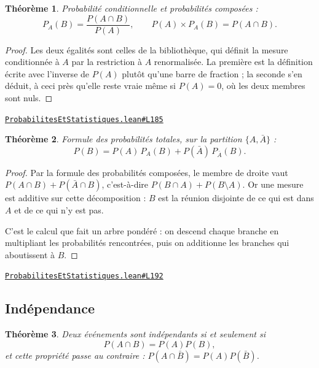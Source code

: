 \documentclass[11pt,a4paper]{article}
\theoremstyle{definition}
\theoremstyle{plain}
\newtheorem{theoreme}{Théorème}
\newcommand{\source}[2]{\par\smallskip\noindent\hfill{\footnotesize\href{#1}{\texttt{#2}}}\par\smallskip}
\begin{document}
\begin{theoreme}
Probabilité conditionnelle et probabilités composées :
\[ P_A(B) = \frac{P(A \cap B)}{P(A)} , \qquad P(A) \times P_A(B) = P(A \cap B) . \]
\end{theoreme}

\begin{proof}
Les deux égalités sont celles de la bibliothèque, qui définit la mesure conditionnée à $A$
par la restriction à $A$ renormalisée. La première est la définition écrite avec l'inverse
de $P(A)$ plutôt qu'une barre de fraction ; la seconde s'en déduit, à ceci près qu'elle
reste vraie même si $P(A) = 0$, où les deux membres sont nuls.
\end{proof}
\source{https://github.com/Commutator-IO/learn-lean/blob/main/cours/02-lycee/09-probabilites-et-statistiques/ProbabilitesEtStatistiques.lean\#L185}{ProbabilitesEtStatistiques.lean\#L185}

\begin{theoreme}
Formule des probabilités totales, sur la partition $\{A, \bar A\}$ :
\[ P(B) = P(A)\,P_A(B) + P(\bar A)\,P_{\bar A}(B) . \]
\end{theoreme}

\begin{proof}
Par la formule des probabilités composées, le membre de droite vaut
$P(A \cap B) + P(\bar A \cap B)$, c'est-à-dire $P(B \cap A) + P(B \setminus A)$. Or une
mesure est additive sur cette décomposition : $B$ est la réunion disjointe de ce qui est
dans $A$ et de ce qui n'y est pas.

\medskip\noindent
C'est le calcul que fait un arbre pondéré : on descend chaque branche en multipliant les
probabilités rencontrées, puis on additionne les branches qui aboutissent à $B$.
\end{proof}
\source{https://github.com/Commutator-IO/learn-lean/blob/main/cours/02-lycee/09-probabilites-et-statistiques/ProbabilitesEtStatistiques.lean\#L192}{ProbabilitesEtStatistiques.lean\#L192}

\subsection{Indépendance}

\begin{theoreme}
Deux événements sont indépendants si et seulement si
\[ P(A \cap B) = P(A)P(B) , \]
et cette propriété passe au contraire : $P(A \cap \bar B) = P(A)P(\bar B)$.
\end{theoreme}
\end{document}
